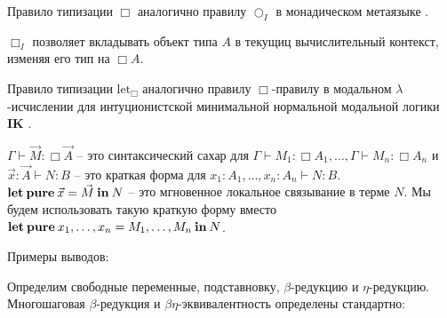 Правило типизации $\Box$ аналогично правилу $\bigcirc_I$ в монадическом метаязыке \cite{Lax}.

$\Box_I$ позволяет вкладывать объект типа $A$ в текущиц вычислительный контекст, изменяя его тип на $\Box A$.

Правило типизации $\text{let}_{\Box}$ аналогично правилу $\Box$-правилу в модальном $\lambda$-исчислении
для интуционистской минимальной нормальной модальной логики {\bf IK} \cite{ModalK}.

$\Gamma \vdash \vec{M} : \Box \vec{A}$ -- это синтаксический сахар для $\Gamma \vdash M_1 : \Box A_1,\dots,\Gamma \vdash M_n : \Box A_n$ и
$\vec{x} : \vec{A} \vdash N : B$ -- это краткая форма для $x_1 : A_1, \dots, x_n : A_n \vdash N : B$.
${\bf let \: pure \:} \vec{x} = \vec{M} {\: \bf in \: } N$ -- это мгновенное локальное связывание в терме $N$.
Мы будем использовать такую краткую форму вместо ${\bf let \: pure\:} x_1,\dots,x_n = M_1,\dots,M_n {\: \bf in \:} N$.

\vspace{\baselineskip}

Примеры выводов:

\begin{prooftree}
\end{prooftree}

\begin{prooftree}
\end{prooftree}

\vspace{\baselineskip}

Определим свободные переменные, подставновку, $\beta$-редукцию и $\eta$-редукцию. Многошаговая $\beta$-редукция и $\beta \eta$-эквивалентность определены стандартно:


